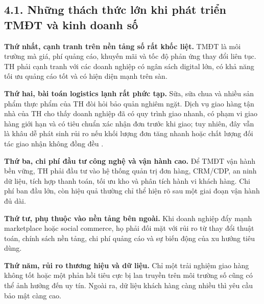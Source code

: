 \subsection*{4.1. Những thách thức lớn khi phát triển TMĐT và kinh doanh số}
\textbf{Thứ nhất, cạnh tranh trên nền tảng số rất khốc liệt.} TMĐT là môi trường mà giá, phí quảng cáo, khuyến mãi và tốc độ phản ứng thay đổi liên tục. TH phải cạnh tranh với các doanh nghiệp có ngân sách digital lớn, có khả năng tối ưu quảng cáo tốt và có hiện diện mạnh trên sàn.

\textbf{Thứ hai, bài toán logistics lạnh rất phức tạp.} Sữa, sữa chua và nhiều sản phẩm thực phẩm của TH đòi hỏi bảo quản nghiêm ngặt. Dịch vụ giao hàng tận nhà của TH cho thấy doanh nghiệp đã có quy trình giao nhanh, có phạm vi giao hàng giới hạn và có tiêu chuẩn xác nhận đơn trước khi giao; tuy nhiên, đây vẫn là khâu dễ phát sinh rủi ro nếu khối lượng đơn tăng nhanh hoặc chất lượng đối tác giao nhận không đồng đều \cite{thtruemartdelivery}.

\textbf{Thứ ba, chi phí đầu tư công nghệ và vận hành cao.} Để TMĐT vận hành bền vững, TH phải đầu tư vào hệ thống quản trị đơn hàng, CRM/CDP, an ninh dữ liệu, tích hợp thanh toán, tối ưu kho và phân tích hành vi khách hàng. Chi phí ban đầu lớn, còn hiệu quả thường chỉ thể hiện rõ sau một giai đoạn vận hành đủ dài.

\textbf{Thứ tư, phụ thuộc vào nền tảng bên ngoài.} Khi doanh nghiệp đẩy mạnh marketplace hoặc social commerce, họ phải đối mặt với rủi ro từ thay đổi thuật toán, chính sách nền tảng, chi phí quảng cáo và sự biến động của xu hướng tiêu dùng.

\textbf{Thứ năm, rủi ro thương hiệu và dữ liệu.} Chỉ một trải nghiệm giao hàng không tốt hoặc một phản hồi tiêu cực bị lan truyền trên môi trường số cũng có thể ảnh hưởng đến uy tín. Ngoài ra, dữ liệu khách hàng càng nhiều thì yêu cầu bảo mật càng cao.

